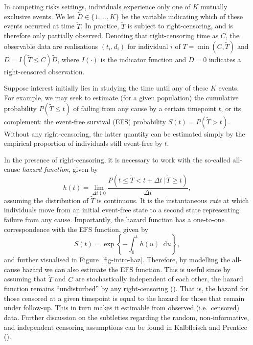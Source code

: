 \documentclass[
  letterpaper,
  paper=240mm:170mm,
  twoside=true,
  open=right,
  fontsize=10pt,
  pagesize=false,
  BCOR=15mm,
  DIV=14,
  headinclude=true,
  footinclude=false,
  headsepline=on]{scrbook}
\newcommand{\given}{\,|\,}
\newcommand\diff{\mathop{}\!\mathrm{d}}
\begin{document}
In competing risks settings, individuals experience only one of \(K\)
mutually exclusive events. We let \(\tilde{D} \in \{1,...,K\}\) be the
variable indicating which of these events occurred at time
\(\tilde{T}\). In practice, \(\tilde{T}\) is subject to right-censoring,
and is therefore only partially observed. Denoting that right-censoring
time as \(C\), the observable data are realisations \((t_i, d_i)\) for
individual \(i\) of \(T = \min(C,\tilde{T})\) and
\(D = I(\tilde{T} \leq C)\tilde{D}\), where \(I(\cdot)\) is the
indicator function and \(D = 0\) indicates a right-censored observation.

Suppose interest initially lies in studying the time until any of these
\(K\) events. For example, we may seek to estimate (for a given
population) the cumulative probability \(P(\tilde{T} \leq t)\) of
failing from any cause by a certain timepoint \(t\), or its complement:
the event-free survival (EFS) probability \(S(t) = P(\tilde{T} > t)\).
Without any right-censoring, the latter quantity can be estimated simply
by the empirical proportion of individuals still event-free by \(t\).

In the presence of right-censoring, it is necessary to work with the
so-called all-cause \emph{hazard function}, given by \[
    h(t) = \lim_{\Delta t \downarrow 0} \frac{P(t \leq \tilde{T} < t + \Delta t\given \tilde{T} \geq t)}{\Delta t},
\] assuming the distribution of \(\tilde{T}\) is continuous. It is the
instantaneous \emph{rate} at which individuals move from an initial
event-free state to a second state representing failure from any cause.
Importantly, the hazard function has a one-to-one correspondence with
the EFS function, given by \[
  S(t) = \exp \left\{ - \int_{0}^{t} h(u)\diff u \right\},
\] and further visualised in Figure~\ref{fig-intro-haz}. Therefore, by
modelling the all-cause hazard we can also estimate the EFS function.
This is useful since by assuming that \(\tilde{T}\) and \(C\) are
stochastically independent of each other, the hazard function remains
``undisturbed'' by any right-censoring
(). That is, the hazard for those censored at a given
timepoint is equal to the hazard for those that remain under follow-up.
This in turn makes it estimable from observed (i.e.~censored) data.
Further discussion on the subtleties regarding the random,
non-informative, and independent censoring assumptions can be found in
Kalbfleisch and Prentice
().
\end{document}
